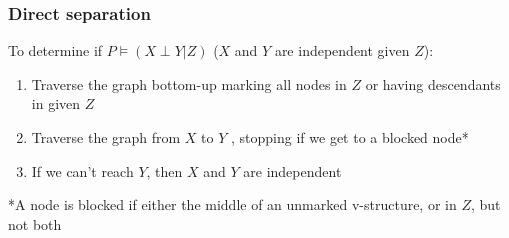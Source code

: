 \documentclass[]{article}
\begin{document}
\subsubsection{Direct separation}

To determine if $P \models (X \perp Y | Z)$ ($X$ and $Y$ are independent given $Z$):

\begin{enumerate}
	\item Traverse the graph bottom-up marking all nodes in $Z$ or having descendants in given $Z$
	\item Traverse the graph from $X$ to $Y$ , stopping if we get to a blocked node*
	\item If we can't reach $Y$, then $X$ and $Y$ are independent
\end{enumerate}

*A node is blocked if either the middle of an unmarked v-structure, or in $Z$, but not both
\end{document}

